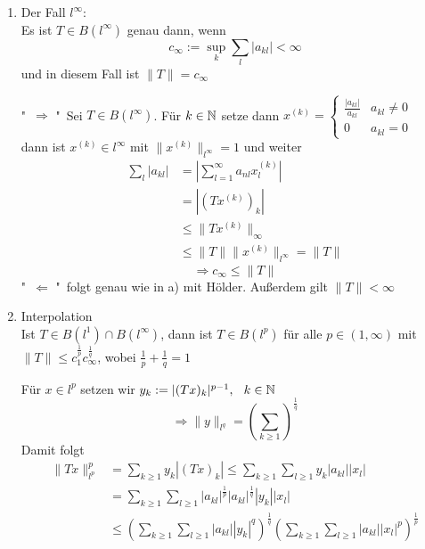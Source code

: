 \begin{beispiel}[Matrizenmultiplikation]
\begin{enumerate}[label=\alph*\upshape)]
\begin{beweis}
		\end{beweis}
	\item Der Fall $l^{\infty}$: \\
		Es ist $T \in B(l^{\infty})$ genau dann, wenn
		\[ c_{\infty} := \sup_{k} \sum_{l} |a_{kl}| < \infty \]
		und in diesem Fall ist $\| T \| = c_{\infty}$
		\begin{beweis}
			"\ $\Rightarrow$ "\  Sei $T \in B(l^{\infty})$.  Für $k \in \mathbb{N}$ setze dann $x^{(k)} = \begin{cases} \frac{|a_{kl}|}{a_{kl}} & a_{kl} \neq 0 \\ 0 & a_{kl} = 0 \end{cases}$ \\
			dann ist $x^{(k)} \in l^{\infty}$ mit $\| x^{(k)} \|_{l^{\infty}} = 1$ und weiter
			\begin{align*}
				\sum_{l} |a_{kl}| & = | \sum_{l = 1}^{\infty} a_{nl} x_{l}^{(k)} | \\
								  & = | ( T x^{(k)} )_{k} | \\
								  & \leq \| T x^{(k)} \|_{\infty} \\
								  & \leq \| T \| \| x^{(k)} \|_{l^{\infty}} = \| T \|
			\end{align*}			
			\[ \Rightarrow c_{\infty} \leq \| T \| \]
			"\ $\Leftarrow$ "\ folgt genau wie in a) mit Hölder. Au{\ss}erdem gilt $\| T \| < \infty$ 
		\end{beweis}
	\item Interpolation \\
		Ist $T \in B(l^{1}) \cap B(l^{\infty})$, dann ist $T \in B(l^{p})$ für alle $p \in (1, \infty)$ mit $\| T \| \leq c_{1}^{\frac{1}{p}} c_{\infty}^{\frac{1}{q}}$, wobei $\frac{1}{p} + \frac{1}{q} = 1$
		\begin{beweis}
		 Für $x \in l^{p}$ setzen wir $y_{k} := |(T x)_{k}|^{p - 1}, \hspace{0.25cm} k \in \mathbb{N}$ \\
		 \[ \Rightarrow \| y \|_{l^{q}} = \left( \sum_{k \geq 1}  \right)^\frac{1}{q} \]	
		 Damit folgt
		 \begin{align*}
		 	\| Tx \|_{l^{p}}^{p} & = \sum_{k \geq 1 } y_{k} | (Tx)_{k} | \leq \sum_{k \geq 1} \sum_{l \geq 1} y_{k} |a_{kl}| |x_{l}| \\
		 	& = \sum_{k \geq 1} \sum_{l \geq 1} |a_{kl}|^{\frac{1}{p}} |a_{kl}|^{\frac{1}{q}} |y_{k}| |x_{l}| \\
		 	& \leq \left( \sum_{k \geq 1} \sum_{l \geq 1} |a_{kl}| |y_{k}|^{q} \right)^{\frac{1}{q}} \left( \sum_{k \geq 1} \sum_{l \geq 1} |a_{kl}| |x_{l}|^p \right)^{\frac{1}{p}} \\

\end{align*}
\end{beweis}
\end{enumerate}
\end{beispiel}
